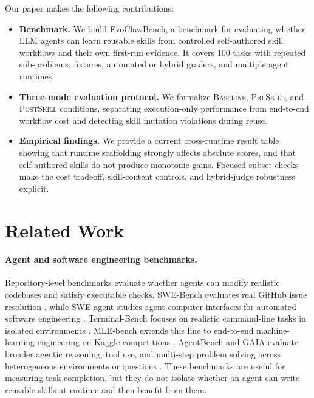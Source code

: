\documentclass[11pt]{article}
\newcommand{\ours}{EvoClawBench}
\newcommand{\baseline}{\textsc{Baseline}}
\newcommand{\preskill}{\textsc{PreSkill}}
\newcommand{\postskill}{\textsc{PostSkill}}
\begin{document}
Our paper makes the following contributions:
\begin{itemize}[leftmargin=*]
    \item \textbf{Benchmark.} We build \ours{}, a benchmark for evaluating whether LLM agents can learn reusable skills from controlled self-authored skill workflows and their own first-run evidence. It covers 100 tasks with repeated sub-problems, fixtures, automated or hybrid graders, and multiple agent runtimes.
    \item \textbf{Three-mode evaluation protocol.} We formalize \baseline{}, \preskill{}, and \postskill{} conditions, separating execution-only performance from end-to-end workflow cost and detecting skill mutation violations during reuse.
    \item \textbf{Empirical findings.} We provide a current cross-runtime result table showing that runtime scaffolding strongly affects absolute scores, and that self-authored skills do not produce monotonic gains. Focused subset checks make the cost tradeoff, skill-content controls, and hybrid-judge robustness explicit.
\end{itemize}

\section{Related Work}
\label{sec:related}

\paragraph{Agent and software engineering benchmarks.}
Repository-level benchmarks evaluate whether agents can modify realistic codebases and satisfy executable checks.
SWE-Bench evaluates real GitHub issue resolution \citep{jimenez2024swebench}, while SWE-agent studies agent-computer interfaces for automated software engineering \citep{yang2024sweagent}.
Terminal-Bench focuses on realistic command-line tasks in isolated environments \citep{merrill2026terminalbench}.
MLE-bench extends this line to end-to-end machine-learning engineering on Kaggle competitions \citep{chan2024mlebench}.
AgentBench and GAIA evaluate broader agentic reasoning, tool use, and multi-step problem solving across heterogeneous environments or questions \citep{liu2023agentbench,mialon2023gaia}.
These benchmarks are useful for measuring task completion, but they do not isolate whether an agent can write reusable skills at runtime and then benefit from them.
\end{document}
